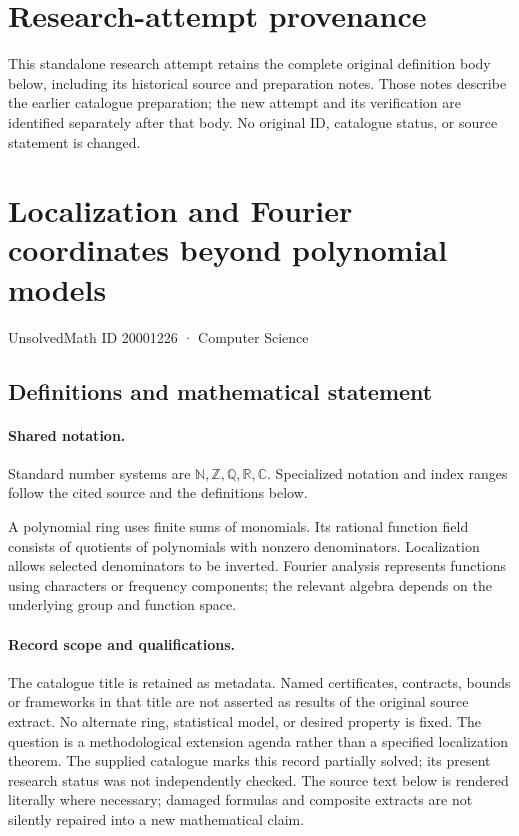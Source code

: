 \documentclass[11pt]{article}
\begin{document}
\section*{Research-attempt provenance}
This standalone research attempt retains the complete original definition body below,
including its historical source and preparation notes. Those notes describe the
earlier catalogue preparation; the new attempt and its verification are identified
separately after that body. No original ID, catalogue status, or source statement is changed.

\section{Localization and Fourier coordinates beyond polynomial models}\label{20001226}
{\small UnsolvedMath ID 20001226 · Computer Science}
\subsection{Definitions and mathematical statement}

\paragraph{Shared notation.}Standard number systems are $\mathbb N,\mathbb Z,\mathbb Q,\mathbb R,\mathbb C$. Specialized notation and index ranges follow the cited source and the definitions below.


A polynomial ring uses finite sums of monomials. Its rational function field consists of quotients of polynomials with nonzero denominators. Localization allows selected denominators to be inverted. Fourier analysis represents functions using characters or frequency components; the relevant algebra depends on the underlying group and function space.
\paragraph{Record scope and qualifications.}
The catalogue title is retained as metadata. Named certificates, contracts, bounds or frameworks in that title are not asserted as results of the original source extract.
No alternate ring, statistical model, or desired property is fixed. The question is a methodological extension agenda rather than a specified localization theorem. The supplied catalogue marks this record partially solved; its present research status was not independently checked.
The source text below is rendered literally where necessary; damaged formulas and composite extracts are not silently repaired into a new mathematical claim.
\end{document}
